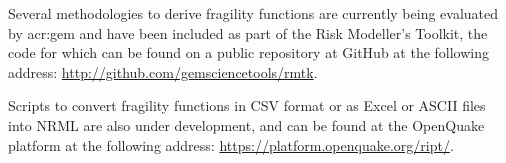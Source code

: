 Several methodologies to derive fragility functions are currently being
evaluated by \gls{acr:gem} and have been included as part of the Risk
Modeller's Toolkit, the code for which can be found on a public repository at
GitHub at the following address: 
\href{http://github.com/gemsciencetools/rmtk}{http://github.com/gemsciencetools/rmtk}.

Scripts to convert \glspl{fragility function} in CSV format or as Excel or
ASCII files into NRML are also under development, and can be found at the
OpenQuake platform at the following address:
\href{https://platform.openquake.org/ript/}{https://platform.openquake.org/ript/}.
